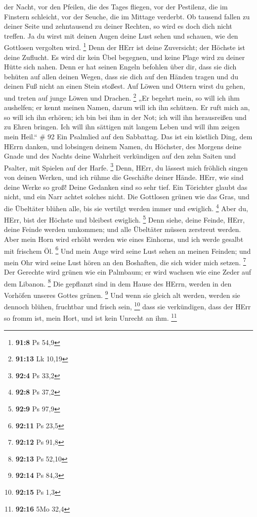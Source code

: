 der Nacht, vor den Pfeilen, die des Tages fliegen,  vor der
Pestilenz, die im Finstern schleicht, vor der Seuche, die im Mittage
verderbt.  Ob tausend fallen zu deiner Seite und zehntausend
zu deiner Rechten, so wird es doch dich nicht treffen.  Ja
du wirst mit deinen Augen deine Lust sehen und schauen, wie den
Gottlosen vergolten wird. \footnote{\textbf{91:8} Ps 54,9} 
Denn der HErr ist deine Zuversicht; der Höchste ist deine Zuflucht.
 Es wird dir kein Übel begegnen, und keine Plage wird zu
deiner Hütte sich nahen.  Denn er hat seinen Engeln
befohlen über dir, dass sie dich behüten auf allen deinen Wegen,
 dass sie dich auf den Händen tragen und du deinen Fuß
nicht an einen Stein stoßest.  Auf Löwen und Ottern wirst
du gehen, und treten auf junge Löwen und Drachen. \footnote{\textbf{91:13}
  Lk 10,19}  „Er begehrt mein, so will ich ihm aushelfen;
er kennt meinen Namen, darum will ich ihn schützen.  Er
ruft mich an, so will ich ihn erhören; ich bin bei ihm in der Not; ich
will ihn herausreißen und zu Ehren bringen.  Ich will ihn
sättigen mit langem Leben und will ihm zeigen mein Heil.`` \# 92
 Ein Psalmlied auf den Sabbattag.  Das ist ein
köstlich Ding, dem HErrn danken, und lobsingen deinem Namen, du
Höchster,  des Morgens deine Gnade und des Nachts deine
Wahrheit verkündigen  auf den zehn Saiten und Psalter, mit
Spielen auf der Harfe. \footnote{\textbf{92:4} Ps 33,2} 
Denn, HErr, du lässest mich fröhlich singen von deinen Werken, und ich
rühme die Geschäfte deiner Hände.  HErr, wie sind deine
Werke so groß! Deine Gedanken sind so sehr tief.  Ein
Törichter glaubt das nicht, und ein Narr achtet solches nicht.
 Die Gottlosen grünen wie das Gras, und die Übeltäter blühen
alle, bis sie vertilgt werden immer und ewiglich. \footnote{\textbf{92:8}
  Ps 37,2}  Aber du, HErr, bist der Höchste und bleibest
ewiglich. \footnote{\textbf{92:9} Ps 97,9}  Denn siehe,
deine Feinde, HErr, deine Feinde werden umkommen; und alle Übeltäter
müssen zerstreut werden.  Aber mein Horn wird erhöht werden
wie eines Einhorns, und ich werde gesalbt mit frischem Öl. \footnote{\textbf{92:11}
  Ps 23,5}  Und mein Auge wird seine Lust sehen an meinen
Feinden; und mein Ohr wird seine Lust hören an den Boshaften, die sich
wider mich setzen. \footnote{\textbf{92:12} Ps 91,8}  Der
Gerechte wird grünen wie ein Palmbaum; er wird wachsen wie eine Zeder
auf dem Libanon. \footnote{\textbf{92:13} Ps 52,10}  Die
gepflanzt sind in dem Hause des HErrn, werden in den Vorhöfen unseres
Gottes grünen. \footnote{\textbf{92:14} Ps 84,3}  Und wenn
sie gleich alt werden, werden sie dennoch blühen, fruchtbar und frisch
sein, \footnote{\textbf{92:15} Ps 1,3}  dass sie
verkündigen, dass der HErr so fromm ist, mein Hort, und ist kein Unrecht
an ihm. \footnote{\textbf{92:16} 5Mo 32,4}

